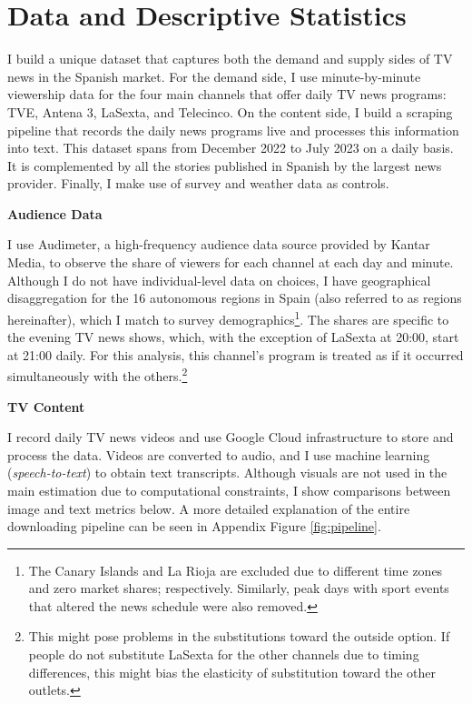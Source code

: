 \documentclass[12pt]{article}
\begin{document}
	\section{Data and Descriptive Statistics}
	\label{section:data}
	
	I build a unique dataset that captures both the demand and supply sides of TV news in the Spanish market. For the demand side, I use minute-by-minute viewership data for the four main channels that offer daily TV news programs: TVE, Antena 3, LaSexta, and Telecinco. On the content side, I build a scraping pipeline that records the daily news programs live and processes this information into text. This dataset spans from December 2022 to July 2023 on a daily basis. It is complemented by all the stories published in Spanish by the largest news provider. Finally, I make use of survey and weather data as controls.
	
	\textbf{Audience Data}
	
	I use Audimeter, a high-frequency audience data source provided by Kantar Media, to observe the share of viewers for each channel at each day and minute. Although I do not have individual-level data on choices, I have geographical disaggregation for the 16 autonomous regions in Spain (also referred to as regions hereinafter), which I match to survey demographics\footnote{The Canary Islands and La Rioja are excluded due to different time zones and zero market shares; respectively. Similarly, peak days with sport events that altered the news schedule were also removed.}. The shares are specific to the evening TV news shows, which, with the exception of LaSexta at 20:00, start at 21:00 daily. For this analysis, this channel’s program is treated as if it occurred simultaneously with the others.\footnote{This might pose problems in the substitutions toward the outside option. If people do not substitute LaSexta for the other channels due to timing differences, this might bias the elasticity of substitution toward the other outlets.}
	
	\textbf{TV Content}
	
	I record daily TV news videos and use Google Cloud infrastructure to store and process the data. Videos are converted to audio, and I use machine learning (\textit{speech-to-text}) to obtain text transcripts. Although visuals are not used in the main estimation due to computational constraints, I show comparisons between image and text metrics below. A more detailed explanation of the entire downloading pipeline can be seen in Appendix Figure \ref{fig:pipeline}.
	
\end{document}
